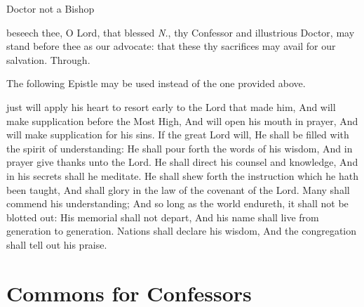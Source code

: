 \begin{inhead}
	Doctor not a Bishop
\end{inhead}
 beseech thee, O Lord, that blessed \textit{N.}, thy Confessor and illustrious Doctor, may stand before thee as our advocate: that these thy sacrifices may avail for our salvation. Through.

\begin{rubric}
	The following Epistle may be used instead of the one provided above.
\end{rubric}
\label{Ecclesiasticus395}\label{CommonDoctorsSecondEpistle}
 just will apply his heart to resort early to the Lord that made him, And will make supplication before the Most High, And will open his mouth in prayer, And will make supplication for his sins. If the great Lord will, He shall be filled with the spirit of understanding: He shall pour forth the words of his wisdom, And in prayer give thanks unto the Lord. He shall direct his counsel and knowledge, And in his secrets shall he meditate. He shall shew forth the instruction which he hath been taught, And shall glory in the law of the covenant of the Lord. Many shall commend his understanding; And so long as the world endureth, it shall not be blotted out: His memorial shall not depart, And his name shall live from generation to generation. Nations shall declare his wisdom, And the congregation shall tell out his praise. 

\clearpage
\section{Commons for Confessors}

